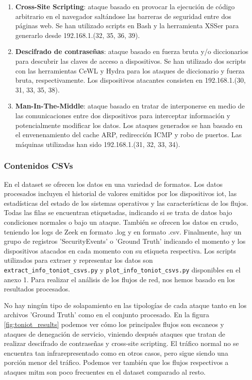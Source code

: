 \begin{enumerate}
  \item \textbf{Cross-Site Scripting}: ataque basado en provocar la ejecución de código arbitrario en el navegador saltándose las barreras de seguridad entre dos páginas web. Se han utilizado scripts en Bash y la herramienta XSSer para generarlo desde 192.168.1.(32, 35, 36, 39).
  \item \textbf{Descifrado de contraseñas}: ataque basado en fuerza bruta y/o diccionarios para descubrir las claves de acceso a dispositivos. Se han utilizado dos scripts con las herramientas CeWL y Hydra para los ataques de diccionario y fuerza bruta, respectivamente. Los dispositivos atacantes consisten en 192.168.1.(30, 31, 33, 35, 38).
  \item \textbf{Man-In-The-Middle}: ataque basado en tratar de interponerse en medio de las comunicaciones entre dos dispositivos para interceptar información y potencialmente modificar los datos. Los ataques generados se han basado en el envenenamiento del cache ARP, redirección ICMP y robo de puertos. Las máquinas utilizadas han sido 192.168.1.(31, 32, 33, 34).
\end{enumerate}

\subsubsection{Contenidos CSVs}

En el dataset se ofrecen los datos en una variedad de formatos. Los datos procesados incluyen el historial de valores emitidos por los dispositivos \acrshort{iot}, las estadísticas del estado de los sistemas operativos y las características de los flujos. Todas las filas se encuentran etiquetadas, indicando si se trata de datos bajo condiciones normales o bajo un ataque. También se ofrecen los datos en crudo, teniendo los logs de Zeek en formato .log y en formato .csv. Finalmente, hay un grupo de registros 'SecurityEvents' o 'Ground Truth' indicando el momento y los dispositivos atacados en cada momento con su etiqueta respectiva. Los scripts utilizados para extraer y representar los datos son \texttt{extract\_info\_toniot\_csvs.py} y \texttt{plot\_info\_toniot\_csvs.py} disponibles en el anexo 1. Para realizar el análisis de los flujos de red, nos hemos basado en los resultados procesados.

No hay ningún tipo de solapamiento en las tipologías de cada ataque tanto en los archivos 'Ground Truth' como en el conjunto procesado. En la figura \ref{fig:toniot_results} podemos ver cómo los principales flujos son escaneos y ataques de denegación de servicio, viniendo después ataques que tratan de realizar descifrado de contraseñas y cross-site scripting. El tráfico normal no se encuentra tan infrarepresentado como en otros casos, pero sigue siendo una porción menor del tráfico. Podemos ver también que los flujos respectivos a ataques \acrshort{mitm} son poco frecuentes en el dataset comparado al resto.

